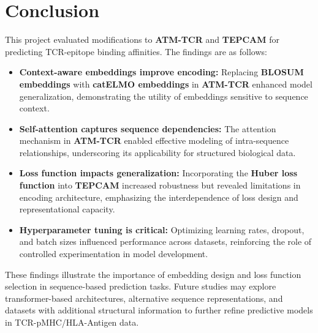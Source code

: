 \documentclass[11pt,a4paper]{article}
\begin{document}
\section{Conclusion}

This project evaluated modifications to \textbf{ATM-TCR} and \textbf{TEPCAM} for predicting TCR-epitope binding affinities. The findings are as follows:

\begin{itemize}
    \item \textbf{Context-aware embeddings improve encoding:} Replacing \textbf{BLOSUM embeddings} with \textbf{catELMO embeddings} in \textbf{ATM-TCR} enhanced model generalization, demonstrating the utility of embeddings sensitive to sequence context.

    \item \textbf{Self-attention captures sequence dependencies:} The attention mechanism in \textbf{ATM-TCR} enabled effective modeling of intra-sequence relationships, underscoring its applicability for structured biological data.

    \item \textbf{Loss function impacts generalization:} Incorporating the \textbf{Huber loss function} into \textbf{TEPCAM} increased robustness but revealed limitations in encoding architecture, emphasizing the interdependence of loss design and representational capacity.

    \item \textbf{Hyperparameter tuning is critical:} Optimizing learning rates, dropout, and batch sizes influenced performance across datasets, reinforcing the role of controlled experimentation in model development.
\end{itemize}

These findings illustrate the importance of embedding design and loss function selection in sequence-based prediction tasks. Future studies may explore transformer-based architectures, alternative sequence representations, and datasets with additional structural information to further refine predictive models in TCR-pMHC/HLA-Antigen data.
\end{document}

